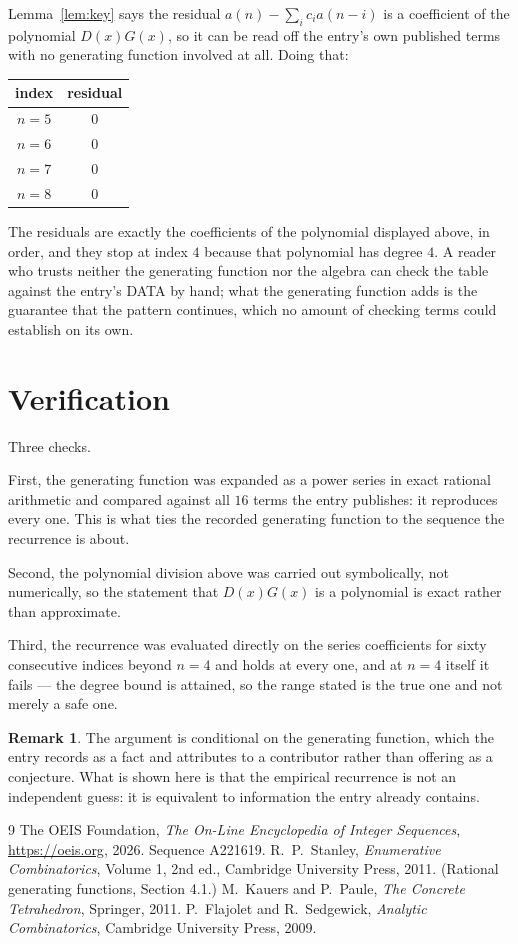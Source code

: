 \documentclass[11pt,a4paper]{article}
\theoremstyle{plain}
\theoremstyle{definition}
\newtheorem{remark}[theorem]{Remark}
\begin{document}
Lemma~\ref{lem:key} says the residual $a(n)-\sum_ic_ia(n-i)$ is a coefficient of the
polynomial $D(x)G(x)$, so it can be read off the entry's own published terms with no
generating function involved at all. Doing that:
\begin{center}
\begin{tabular}{cc}
index & residual \\ \hline
$n=5$ & $0$ \\
$n=6$ & $0$ \\
$n=7$ & $0$ \\
$n=8$ & $0$
\end{tabular}
\end{center}
The residuals are exactly the coefficients of the polynomial displayed above, in order, and
they stop at index $4$ because that polynomial has degree $4$. A reader who trusts
neither the generating function nor the algebra can check the table against the entry's DATA
by hand; what the generating function adds is the guarantee that the pattern continues, which
no amount of checking terms could establish on its own.

\section{Verification}

Three checks.

First, the generating function was expanded as a power series in exact rational arithmetic and
compared against all $16$ terms the entry publishes: it reproduces every one. This is
what ties the recorded generating function to the sequence the recurrence is about.

Second, the polynomial division above was carried out symbolically, not numerically, so the
statement that $D(x)G(x)$ is a polynomial is exact rather than approximate.

Third, the recurrence was evaluated directly on the series coefficients for sixty consecutive
indices beyond $n=4$ and holds at every one, and at $n=4$ itself it fails --- the
degree bound is attained, so the range stated is the true one and not merely a safe one.

\begin{remark}
The argument is conditional on the generating function, which the entry records as a fact and
attributes to a contributor rather than offering as a conjecture. What is shown here is that
the empirical recurrence is not an independent guess: it is equivalent to information the
entry already contains.
\end{remark}

\begin{thebibliography}{9}
 The OEIS Foundation, \emph{The On-Line Encyclopedia of Integer
Sequences}, \url{https://oeis.org}, 2026. Sequence A221619.
 R.~P.~Stanley, \emph{Enumerative Combinatorics}, Volume 1, 2nd ed.,
Cambridge University Press, 2011. (Rational generating functions, Section 4.1.)
 M.~Kauers and P.~Paule, \emph{The Concrete Tetrahedron}, Springer, 2011.
 P.~Flajolet and R.~Sedgewick, \emph{Analytic Combinatorics}, Cambridge
University Press, 2009.
\end{thebibliography}
\end{document}
